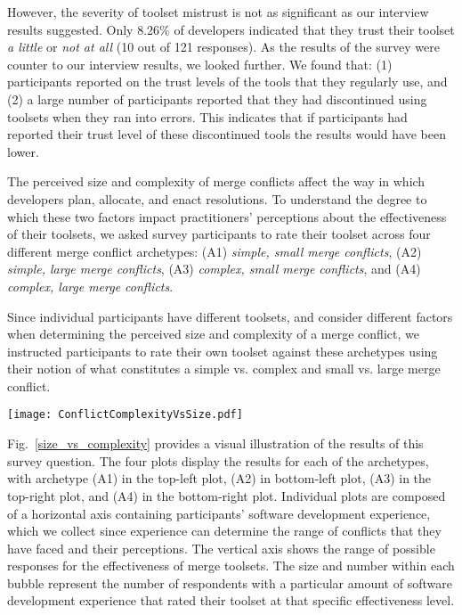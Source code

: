 However, the severity of toolset mistrust is not as significant as our interview results suggested.
Only 8.26\% of developers indicated that they trust their toolset \textit{a little} or \textit{not at all} (10 out of 121 responses).
As the results of the survey were counter to our interview results, we looked further. We found that: (1) participants reported on the trust levels of the tools that they regularly use, and (2) a large number of participants reported that they had discontinued using toolsets when they ran into errors. This indicates that if participants had reported their trust level of these discontinued tools the results would have been lower.

\label{tool_effectiveness}
The perceived size and complexity of merge conflicts affect the way in which developers plan, allocate, and enact resolutions.
To understand the degree to which these two factors impact practitioners' perceptions about the effectiveness of their toolsets, we asked survey participants to rate their toolset across four different merge conflict archetypes: (A1) \textit{simple, small merge conflicts}, (A2) \textit{simple, large merge conflicts}, (A3) \textit{complex, small merge conflicts}, and (A4) \textit{complex, large merge conflicts}.

Since individual participants have different toolsets, and consider different factors when determining the perceived size and complexity of a merge conflict, we instructed participants to rate their own toolset against these archetypes using their notion of what constitutes a simple vs. complex and small vs. large merge conflict.

\begin{figure*}[!htbp]
\centering
\texttt{[image: ConflictComplexityVsSize.pdf]}
\caption{Effectiveness of practitioners' toolsets in supporting perceived size and complexity of merge conflicts, split on development experience. Bubble values indicate number of survey responses for effectiveness of a particular merge conflict size and complexity, and bubble size indicates the number of responses for comparison purposes.\vspace*{-0.5\baselineskip}}
\label{size_vs_complexity}
\end{figure*}

Fig.~\ref{size_vs_complexity} provides a visual illustration of the results of this survey question.
The four plots display the results for each of the archetypes, with archetype (A1) in the top-left plot, (A2) in bottom-left plot, (A3) in the top-right plot, and (A4) in the bottom-right plot.
Individual plots are composed of a horizontal axis containing participants' software development experience, which we collect since experience can determine the range of conflicts that they have faced and their perceptions.
The vertical axis shows the range of possible responses for the effectiveness of merge toolsets.
The size and number within each bubble represent the number of respondents with a particular amount of software development experience that rated their toolset at that specific effectiveness level.

